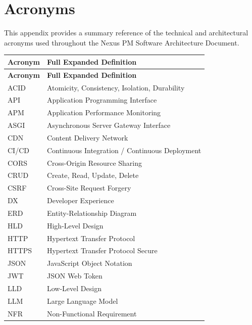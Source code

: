 \chapter{Acronyms}
\label{app:acronyms}

This appendix provides a summary reference of the technical and architectural acronyms used throughout the Nexus PM Software Architecture Document.

\begingroup
\renewcommand{\arraystretch}{1.4}
\begin{longtable}{l p{}}
    \toprule[1.5pt]
    \rowcolor{primary!5}
    \textbf{\color{primary}Acronym} & \textbf{\color{primary}Full Expanded Definition} \\
    \midrule
    \endfirsthead
    \toprule[1.5pt]
    \rowcolor{primary!5}
    \textbf{\color{primary}Acronym} & \textbf{\color{primary}Full Expanded Definition} \\
    \midrule
    \endhead
    \bottomrule[1.5pt]
    \endfoot
    \bottomrule[1.5pt]
    \endlastfoot
    ACID & Atomicity, Consistency, Isolation, Durability \\
    API & Application Programming Interface \\
    APM & Application Performance Monitoring \\
    ASGI & Asynchronous Server Gateway Interface \\
    CDN & Content Delivery Network \\
    CI/CD & Continuous Integration / Continuous Deployment \\
    CORS & Cross-Origin Resource Sharing \\
    CRUD & Create, Read, Update, Delete \\
    CSRF & Cross-Site Request Forgery \\
    DX & Developer Experience \\
    ERD & Entity-Relationship Diagram \\
    HLD & High-Level Design \\
    HTTP & Hypertext Transfer Protocol \\
    HTTPS & Hypertext Transfer Protocol Secure \\
    JSON & JavaScript Object Notation \\
    JWT & JSON Web Token \\
    LLD & Low-Level Design \\
    LLM & Large Language Model \\
    NFR & Non-Functional Requirement \\

\end{longtable}
